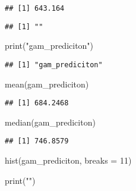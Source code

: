 \documentclass[
]{article}
\newenvironment{Shaded}{\begin{snugshade}}{\end{snugshade}}
\newcommand{\AttributeTok}[1]{\textcolor[rgb]{0.77,0.63,0.00}{#1}}
\newcommand{\DecValTok}[1]{\textcolor[rgb]{0.00,0.00,0.81}{#1}}
\newcommand{\FunctionTok}[1]{\textcolor[rgb]{0.00,0.00,0.00}{#1}}
\newcommand{\NormalTok}[1]{#1}
\newcommand{\SpecialCharTok}[1]{\textcolor[rgb]{0.00,0.00,0.00}{#1}}
\newcommand{\StringTok}[1]{\textcolor[rgb]{0.31,0.60,0.02}{#1}}
\begin{document}
\begin{verbatim}
## [1] 643.164
\end{verbatim}

\begin{Shaded}
\end{Shaded}

\begin{verbatim}
## [1] ""
\end{verbatim}

\begin{Shaded}
\begin{Highlighting}[]
\FunctionTok{print}\NormalTok{(}\StringTok{"gam\_prediciton"}\NormalTok{)}
\end{Highlighting}
\end{Shaded}

\begin{verbatim}
## [1] "gam_prediciton"
\end{verbatim}

\begin{Shaded}
\begin{Highlighting}[]
\FunctionTok{mean}\NormalTok{(gam\_prediciton)}
\end{Highlighting}
\end{Shaded}

\begin{verbatim}
## [1] 684.2468
\end{verbatim}

\begin{Shaded}
\begin{Highlighting}[]
\FunctionTok{median}\NormalTok{(gam\_prediciton)}
\end{Highlighting}
\end{Shaded}

\begin{verbatim}
## [1] 746.8579
\end{verbatim}

\begin{Shaded}
\begin{Highlighting}[]
\FunctionTok{hist}\NormalTok{(gam\_prediciton, }\AttributeTok{breaks =} \DecValTok{11}\NormalTok{)}

\FunctionTok{print}\NormalTok{(}\StringTok{""}\NormalTok{)}
\end{Highlighting}
\end{Shaded}
\end{document}
